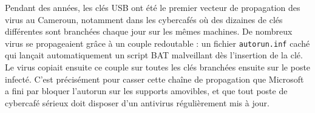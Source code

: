 \documentclass[11pt]{article}
\begin{document}
\begin{savaistu}
Pendant des années, les clés USB ont été le premier vecteur de propagation des virus au Cameroun, notamment dans les cybercafés où des dizaines de clés différentes sont branchées chaque jour sur les mêmes machines. De nombreux virus se propageaient grâce à un couple redoutable : un fichier \texttt{autorun.inf} caché qui lançait automatiquement un script BAT malveillant dès l'insertion de la clé. Le virus copiait ensuite ce couple sur toutes les clés branchées ensuite sur le poste infecté. C'est précisément pour casser cette chaîne de propagation que Microsoft a fini par bloquer l'autorun sur les supports amovibles, et que tout poste de cybercafé sérieux doit disposer d'un antivirus régulièrement mis à jour.
\end{savaistu}
\end{document}
